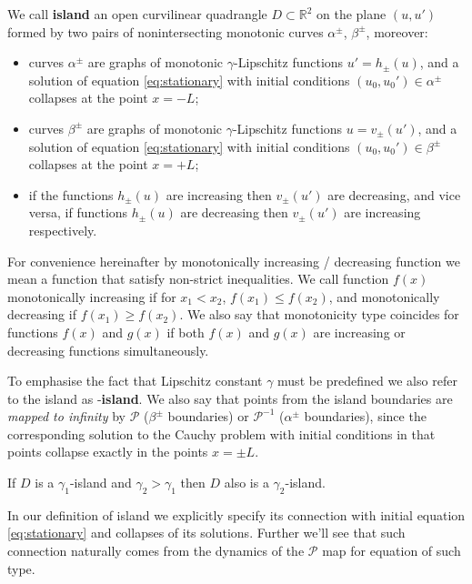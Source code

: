 \begin{definition}
	We call {\bf island} an open curvilinear quadrangle $D \subset \mathbb{R}^2$ on the plane $(u, u')$ formed by two pairs of nonintersecting monotonic curves $\alpha^{\pm}$, $\beta^{\pm}$, moreover:
	\begin{itemize}
		\item curves $\alpha^{\pm}$ are graphs of monotonic $\gamma$-Lipschitz functions $u' = h_{\pm}(u)$, and a solution of equation \eqref{eq:stationary} with initial conditions $(u_0, u_0') \in \alpha^{\pm}$ collapses at the point $x = -L$;
		\item curves $\beta^{\pm}$ are graphs of monotonic $\gamma$-Lipschitz functions $u = v_{\pm}(u')$, and a solution of equation \eqref{eq:stationary} with initial conditions $(u_0, u_0') \in \beta^{\pm}$ collapses at the point $x = +L$;
		\item if the functions $h_{\pm}(u)$ are increasing then $v_{\pm}(u')$ are decreasing, and vice versa, if functions $h_{\pm}(u)$ are decreasing then $v_{\pm}(u')$ are increasing respectively.
	\end{itemize}	
\end{definition}

\begin{remark}
	For convenience hereinafter by monotonically increasing / decreasing function we mean a function that satisfy non-strict inequalities.
	We call function $f(x)$ monotonically increasing if for $x_1 < x_2$, $f(x_1) \le f(x_2)$, and monotonically decreasing if $f(x_1) \ge f(x_2)$.
	We also say that monotonicity type coincides for functions $f(x)$ and $g(x)$ if both $f(x)$ and $g(x)$ are increasing or decreasing functions simultaneously.
\end{remark}

To emphasise the fact that Lipschitz constant $\gamma$ must be predefined we also refer to the island as \bm{$\gamma$}-{\bf island}.
We also say that points from the island boundaries are {\it mapped to infinity} by $\mathcal{P}$ ($\beta^{\pm}$ boundaries) or $\mathcal{P}^{-1}$ ($\alpha^{\pm}$ boundaries), since the corresponding solution to the Cauchy problem with initial conditions in that points collapse exactly in the points $x = \pm L$.

\begin{remark}
	If $D$ is a $\gamma_1$-island and $\gamma_2 > \gamma_1$	then $D$ also is a $\gamma_2$-island.
\end{remark}

In our definition of island we explicitly specify its connection with initial equation \eqref{eq:stationary} and collapses of its solutions.
Further we'll see that such connection naturally comes from the dynamics of the $\mathcal{P}$ map for equation of such type.

